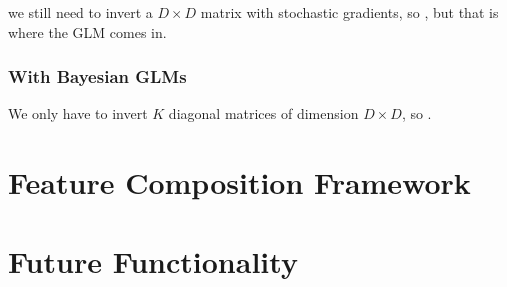\documentclass[11pt, oneside]{article}
\begin{document}
we still need to invert a $D \times D$ matrix with stochastic gradients, so
, but that is where the GLM comes in.

\subsubsection{With Bayesian GLMs}

We only have to invert $K$ diagonal matrices of dimension $D \times D$, so
.

\section{Feature Composition Framework}

\section{Future Functionality}

\printbibliography%
\end{document}

